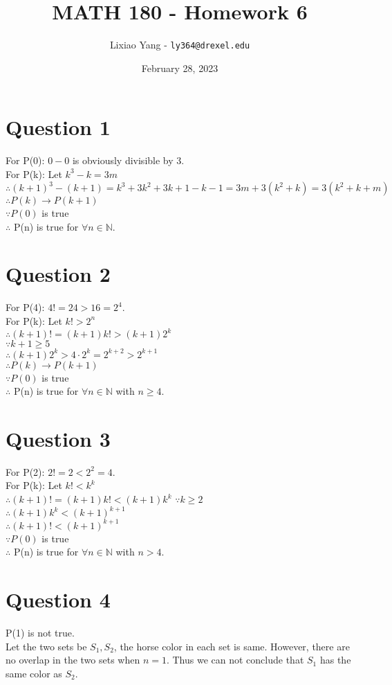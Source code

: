 \documentclass[11pt, oneside]{article}   	%
\title{\bf MATH 180 - Homework 6}
\author{Lixiao Yang - \texttt{ly364@drexel.edu}}
\date{February 28, 2023}							%
\begin{document}
\maketitle

\section*{Question 1}

	For P(0): $0-0$ is obviously divisible by 3.\\
	For P(k): Let $k^{3}-k=3m$\\
	$\therefore (k+1)^3-(k+1)=k^{3}+3k^{2}+3k+1-k-1=3m+3(k^{2}+k)=3(k^{2}+k+m)$\\
	$\therefore P(k)\rightarrow P(k+1)$\\
	$\because P(0)$ is true\\
	$\therefore$ P(n) is true for $\forall n\in \mathbb{N}$. 

\section*{Question 2}

	For P(4): $4!=24>16=2^{4}$.\\
	For P(k): Let $k!>2^{n}$\\
	$\therefore (k+1)!=(k+1)k!>(k+1)2^{k}$\\
	$\because k+1\geq 5$\\
	$\therefore (k+1)2^{k}>4\cdot2^{k}=2^{k+2}>2^{k+1}$\\
	$\therefore P(k)\rightarrow P(k+1)$\\
	$\because P(0)$ is true\\
	$\therefore$ P(n) is true for $\forall n\in \mathbb{N}$ with $n\geq 4$.

\section*{Question 3}

	For P(2): $2!=2<2^{2}=4$.\\
	For P(k): Let $k!<k^{k}$\\
	$\therefore (k+1)!=(k+1)k!<(k+1)k^{k}$
	$\because k\geq 2$\\
	$\therefore (k+1)k^{k}<(k+1)^{k+1}$\\
	$\therefore (k+1)!<(k+1)^{k+1}$\\
	$\because P(0)$ is true\\
	$\therefore$ P(n) is true for $\forall n\in \mathbb{N}$ with $n>4$. 

\section*{Question 4}

	P(1) is not true.\\
	Let the two sets be $S_{1},S_{2}$, the horse color in each set is same. However, there are no overlap
	in the two sets when $n=1$. Thus we can not conclude that $S_{1}$ has the same color as $S_{2}$.
\end{document}

